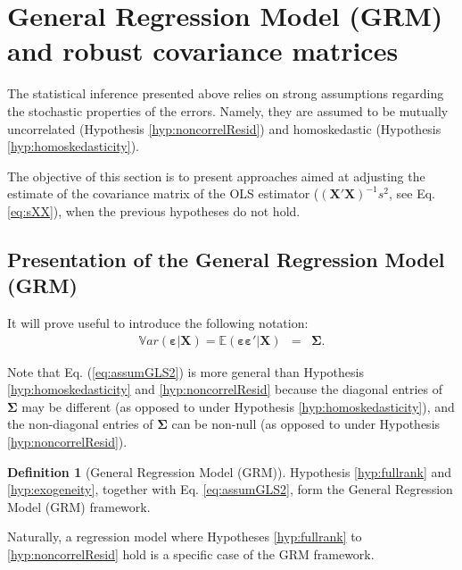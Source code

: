 \documentclass[
  12pt,
]{book}
\theoremstyle{definition}
\newtheorem{definition}{Definition}[chapter]
\theoremstyle{definition}
\theoremstyle{definition}
\theoremstyle{definition}
\theoremstyle{remark}
\begin{document}
\hypertarget{general-regression-model-grm-and-robust-covariance-matrices}{%
\section{General Regression Model (GRM) and robust covariance matrices}\label{general-regression-model-grm-and-robust-covariance-matrices}}

The statistical inference presented above relies on strong assumptions regarding the stochastic properties of the errors. Namely, they are assumed to be mutually uncorrelated (Hypothesis \ref{hyp:noncorrelResid}) and homoskedastic (Hypothesis \ref{hyp:homoskedasticity}).

The objective of this section is to present approaches aimed at adjusting the estimate of the covariance matrix of the OLS estimator (\((\mathbf{X}'\mathbf{X})^{-1}s^2\), see Eq. \eqref{eq:sXX}), when the previous hypotheses do not hold.

\hypertarget{presentation-of-the-general-regression-model-grm}{%
\subsection{Presentation of the General Regression Model (GRM)}\label{presentation-of-the-general-regression-model-grm}}

It will prove useful to introduce the following notation:
\begin{eqnarray}
\mathbb{V}ar(\boldsymbol\varepsilon | \mathbf{X}) = \mathbb{E}(\boldsymbol\varepsilon \boldsymbol\varepsilon'| \mathbf{X}) &=& \boldsymbol\Sigma. \label{eq:assumGLS2}
\end{eqnarray}

Note that Eq. (\eqref{eq:assumGLS2}) is more general than Hypothesis \ref{hyp:homoskedasticity} and \ref{hyp:noncorrelResid} because the diagonal entries of \(\boldsymbol\Sigma\) may be different (as opposed to under Hypothesis \ref{hyp:homoskedasticity}), and the non-diagonal entries of \(\boldsymbol\Sigma\) can be non-null (as opposed to under Hypothesis \ref{hyp:noncorrelResid}).

\begin{definition}[General Regression Model (GRM)]
\protect\hypertarget{def:GRM}{}\label{def:GRM}Hypothesis \ref{hyp:fullrank} and \ref{hyp:exogeneity}, together with Eq. \eqref{eq:assumGLS2}, form the General Regression Model (GRM) framework.
\end{definition}

Naturally, a regression model where Hypotheses \ref{hyp:fullrank} to \ref{hyp:noncorrelResid} hold is a specific case of the GRM framework.
\end{document}
